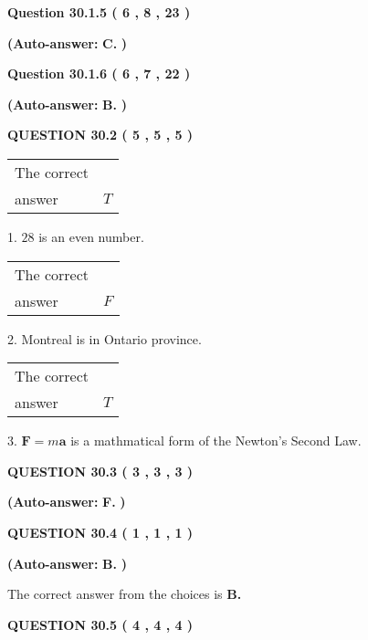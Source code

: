 \documentclass[12pt]{article}
\begin{document}
 
  
  
{\textbf{\large{Question
30.1.5 
 (           6 ,           8 ,          23 )
}}}
 
 
{\textbf{(Auto-answer:}}
{\textbf{\large{
C.}}}
{\textbf{)}}
 
 
  
  
{\textbf{\large{Question
30.1.6 
 (           6 ,           7 ,          22 )
}}}
 
 
{\textbf{(Auto-answer:}}
{\textbf{\large{
B.}}}
{\textbf{)}}
 
 
  
  
{\textbf{\large{QUESTION
30.2 
 (           5 ,           5 ,           5 )
}}}

 
\noindent\begin{tabular}{|l|l|}\hline The correct & \\
          answer &  %
$T$ \\ \hline \end{tabular}
1. $ %
28$ is an  %
even number.
 
\noindent\begin{tabular}{|l|l|}\hline The correct & \\
          answer &  %
$F$ \\ \hline \end{tabular}
2.  %
Montreal is in  %
Ontario province.
 
\noindent\begin{tabular}{|l|l|}\hline The correct & \\
          answer &  %
$T$ \\ \hline \end{tabular}
3.  %
$\mathbf{F}=m\mathbf{a}$ is a mathmatical form of  %
the Newton's Second Law.
 
  
  
{\textbf{\large{QUESTION
30.3 
 (           3 ,           3 ,           3 )
}}}
 
 
{\textbf{(Auto-answer:}}
{\textbf{\large{
F.}}}
{\textbf{)}}
 
 
  
  
{\textbf{\large{QUESTION
30.4 
 (           1 ,           1 ,           1 )
}}}
 
 
{\textbf{(Auto-answer:}}
{\textbf{\large{
B.}}}
{\textbf{)}}
 
 

The correct answer from the choices is
{\textbf{\large{
B.}}}
 
  
  
{\textbf{\large{QUESTION
30.5 
 (           4 ,           4 ,           4 )
}}}
 
\end{document}

